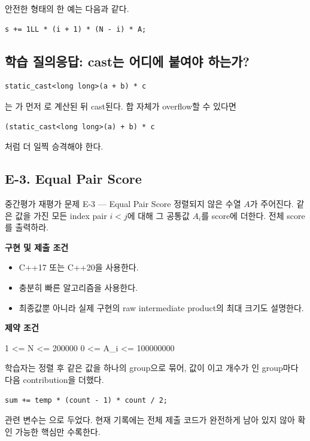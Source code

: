 안전한 형태의 한 예는 다음과 같다.
\begin{lstlisting}
s += 1LL * (i + 1) * (N - i) * A;
\end{lstlisting}

\subsection{학습 질의응답: cast는 어디에 붙여야 하는가?}
\begin{lstlisting}
static_cast<long long>(a + b) * c
\end{lstlisting}
는 가 먼저 로 계산된 뒤 cast된다. 합 자체가 overflow할 수 있다면
\begin{lstlisting}
(static_cast<long long>(a) + b) * c
\end{lstlisting}
처럼 더 일찍 승격해야 한다.

\subsection{E-3. Equal Pair Score}
\begin{problembox}{중간평가 재평가 문제 E-3 --- Equal Pair Score}
정렬되지 않은 수열 $A$가 주어진다. 같은 값을 가진 모든 index pair $i<j$에 대해 그 공통값 $A_i$를 score에 더한다. 전체 score를 출력하라.

\textbf{구현 및 제출 조건}
\begin{itemize}
  \item C++17 또는 C++20을 사용한다.
  \item 충분히 빠른 알고리즘을 사용한다.
  \item 최종값뿐 아니라 실제 구현의 raw intermediate product의 최대 크기도 설명한다.
\end{itemize}

\textbf{제약 조건}
\begin{TextBlock}
1 <= N <= 200000
0 <= A_i <= 100000000
\end{TextBlock}
\end{problembox}

\begin{answerbox}
학습자는 정렬 후 같은 값을 하나의 group으로 묶어, 값이 이고 개수가 인 group마다 다음 contribution을 더했다.
\begin{lstlisting}
sum += temp * (count - 1) * count / 2;
\end{lstlisting}
관련 변수는 으로 두었다. 현재 기록에는 전체 제출 코드가 완전하게 남아 있지 않아 확인 가능한 핵심만 수록한다.
\end{answerbox}

